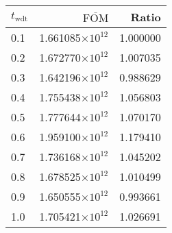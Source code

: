 \begin{tabular}{lrr}
\toprule
$t_{\mathrm{wdt}}$ & $\overline{\mathrm{FOM}}$ &    Ratio \\
\midrule
               0.1 &  1.661085$\times 10^{12}$ & 1.000000 \\
               0.2 &  1.672770$\times 10^{12}$ & 1.007035 \\
               0.3 &  1.642196$\times 10^{12}$ & 0.988629 \\
               0.4 &  1.755438$\times 10^{12}$ & 1.056803 \\
               0.5 &  1.777644$\times 10^{12}$ & 1.070170 \\
               0.6 &  1.959100$\times 10^{12}$ & 1.179410 \\
               0.7 &  1.736168$\times 10^{12}$ & 1.045202 \\
               0.8 &  1.678525$\times 10^{12}$ & 1.010499 \\
               0.9 &  1.650555$\times 10^{12}$ & 0.993661 \\
               1.0 &  1.705421$\times 10^{12}$ & 1.026691 \\
\bottomrule
\end{tabular}

